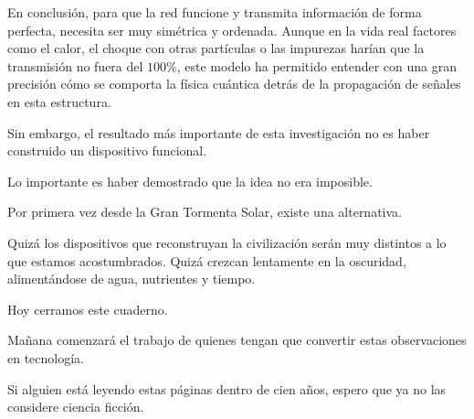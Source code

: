 \documentclass[a4paper,12pt]{article}
\begin{document}
En conclusión, para que la red funcione y transmita información de forma perfecta, necesita ser muy simétrica y ordenada. Aunque en la vida real factores como el calor, el choque con otras partículas o las impurezas harían que la transmisión no fuera del $100\%$, este modelo ha permitido entender con una gran precisión cómo se comporta la física cuántica detrás de la propagación de señales en esta estructura.

Sin embargo, el resultado más importante de esta investigación no es haber construido un dispositivo funcional.

Lo importante es haber demostrado que la idea no era imposible.

Por primera vez desde la Gran Tormenta Solar, existe una alternativa.

Quizá los dispositivos que reconstruyan la civilización serán muy distintos a lo que estamos acostumbrados. Quizá crezcan lentamente en la oscuridad, alimentándose de agua, nutrientes y tiempo.

Hoy cerramos este cuaderno.

Mañana comenzará el trabajo de quienes tengan que convertir estas observaciones en tecnología.

Si alguien está leyendo estas páginas dentro de cien años, espero que ya no las considere ciencia ficción.

\newpage



\end{document}
